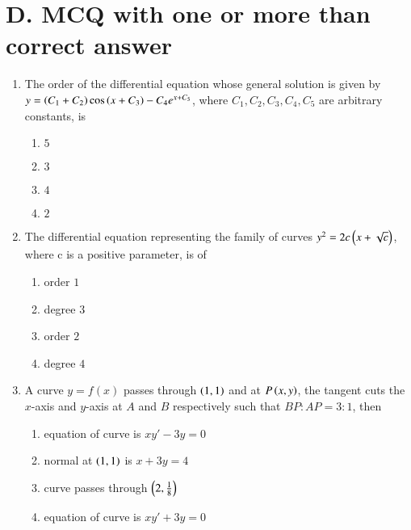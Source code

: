 \documentclass[journal,12pt,twocolumn]{IEEEtran}
\theoremstyle{remark}
\begin{document}
\section*{D. MCQ with one or more than correct answer}
\begin{enumerate}
    
\item The order of the differential equation whose general solution is given by
$y = \left(C_1 + C_2\right) \cos \left(x + C_3\right) - C_4 e^{x+C_5}$, where $C_1, C_2, C_3, C_4, C_5$ are arbitrary constants, is \hfill {}

\begin{multicols}{2}
\begin{enumerate}
    \item $5$
    \item $3$ 
    \item $4$
    \item $2$ 
\end{enumerate} 
\end{multicols}

\item  The differential equation representing the family of curves
$y^2 = 2c \left(x + \sqrt{c}\right)$, where c  is a positive parameter, is of \hfill {}

\begin{multicols}{2}
\begin{enumerate}
    \item order $1$ 
    \item degree $3$
    \item order $2$
    \item degree $4$
\end{enumerate}
\end{multicols}

\item  A curve $ y = f(x) $ passes through $ \left(1,1\right) $ and at $ P\left(x, y\right) $, the tangent cuts the $ x $-axis and $ y $-axis at $ A $ and $ B $ respectively such that $ BP : AP = 3 : 1 $, then \hfill {}
\begin{enumerate}[label=(\alph*)]
    \item equation of curve is $ xy' - 3y = 0 $
    \item normal at $ \left(1, 1\right) $ is $ x + 3y = 4 $
    \item curve passes through $ \left(2, \frac{1}{8}\right) $
    \item equation of curve is $xy' + 3y = 0 $
\end{enumerate}


\end{enumerate}
\end{document}

